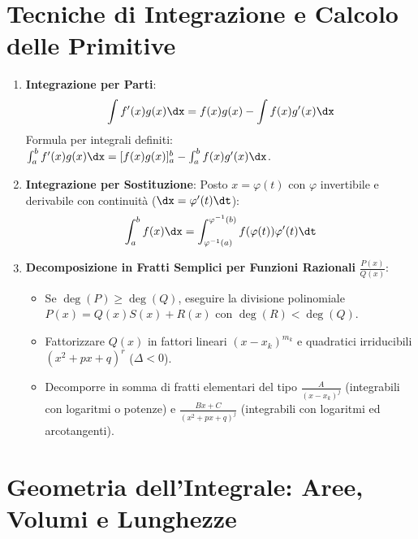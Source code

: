 \section{Tecniche di Integrazione e Calcolo delle Primitive}
\label{sec:tecniche_integrazione_teoria}

\begin{metodo}
\begin{enumerate}
    \item \textbf{Integrazione per Parti}:
    \[
        \int f'(x) g(x) \dx = f(x) g(x) - \int f(x) g'(x) \dx
    \]
    Formula per integrali definiti: $\int_a^b f'(x) g(x) \dx = [f(x)g(x)]_a^b - \int_a^b f(x)g'(x)\dx$.

    \item \textbf{Integrazione per Sostituzione}:
    Posto $x = \varphi(t)$ con $\varphi$ invertibile e derivabile con continuità ($\dx = \varphi'(t)\dt$):
    \[
        \int_a^b f(x) \dx = \int_{\varphi^{-1}(a)}^{\varphi^{-1}(b)} f(\varphi(t)) \varphi'(t) \dt
    \]

    \item \textbf{Decomposizione in Fratti Semplici per Funzioni Razionali} $\frac{P(x)}{Q(x)}$:
    \begin{itemize}
        \item Se $\deg(P) \ge \deg(Q)$, eseguire la divisione polinomiale $P(x) = Q(x)S(x) + R(x)$ con $\deg(R) < \deg(Q)$.
        \item Fattorizzare $Q(x)$ in fattori lineari $(x - x_k)^{m_k}$ e quadratici irriducibili $(x^2 + p x + q)^r$ ($\Delta < 0$).
        \item Decomporre in somma di fratti elementari del tipo $\frac{A}{(x - x_k)^j}$ (integrabili con logaritmi o potenze) e $\frac{B x + C}{(x^2 + p x + q)^j}$ (integrabili con logaritmi ed arcotangenti).
    \end{itemize}
\end{enumerate}
\end{metodo}

\section{Geometria dell'Integrale: Aree, Volumi e Lunghezze}
\label{sec:geometria_integrale}

